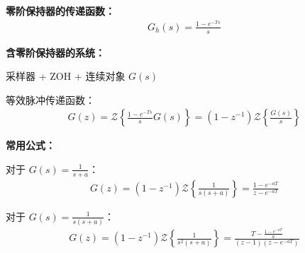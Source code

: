 \begin{minipage}[t]{0.52\textwidth}
\textbf{零阶保持器的传递函数：}
\begin{align*}
G_h(s) = \frac{1 - e^{-Ts}}{s}
\end{align*}

\textbf{含零阶保持器的系统：}

采样器 + ZOH + 连续对象 $G(s)$

等效脉冲传递函数：
\begin{align*}
G(z) = \mathcal{Z}\left\{\frac{1-e^{-Ts}}{s} G(s)\right\} = (1-z^{-1})\mathcal{Z}\left\{\frac{G(s)}{s}\right\}
\end{align*}

\vspace{0.3cm}
\textbf{常用公式：}

对于 $G(s) = \frac{1}{s+a}$：
\begin{align*}
G(z) = (1-z^{-1})\mathcal{Z}\left\{\frac{1}{s(s+a)}\right\} = \frac{1-e^{-aT}}{z-e^{-aT}}
\end{align*}

对于 $G(s) = \frac{1}{s(s+a)}$：
\begin{align*}
G(z) = (1-z^{-1})\mathcal{Z}\left\{\frac{1}{s^2(s+a)}\right\} = \frac{T - \frac{1-e^{-aT}}{a}}{(z-1)(z-e^{-aT})}
\end{align*}
\end{minipage}\hfill
